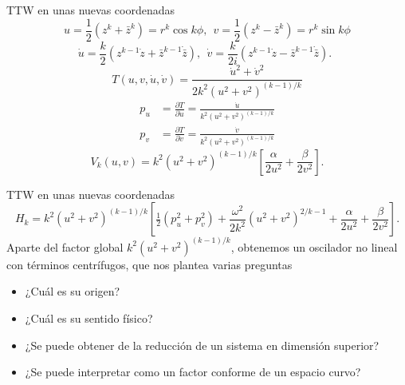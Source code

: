 \documentclass[aspectratio=169,mathserif]{beamer}
\begin{document}
  \begin{frame}{TTW en unas nuevas coordenadas}
    \begin{equation*}
	u=\frac{1}{2}(z^k+\bar{z}^k)=r^k\cos k\phi, \ \
	v=\frac{1}{2}(z^k-\bar{z}^k)=r^k\sin k\phi
    \end{equation*}
    \pause
    \begin{equation*}
      \dot{u}=\frac{k}{2}(z^{k-1}\dot{z}+\bar{z}^{k-1}\dot{\bar{z}}), \ \
      \dot{v}=\frac{k}{2i}(z^{k-1}\dot{z}-\bar{z}^{k-1}\dot{\bar{z}}). \ \
    \end{equation*}
    \pause
    \begin{equation*}
      T(u,v,\dot{u},\dot{v})=\frac{\dot{u}^2+\dot{v}^2}{2k^2(u^2+v^2)^{(k-1)/k}}
    \end{equation*}
    \pause
    \begin{align*}
      p_u&=\frac{\partial T}{\partial \dot{u}}=\frac{\dot{u}}{k^2(u^2+v^2)^{(k-1)/k}}\\
      p_v&=\frac{\partial T}{\partial \dot{v}}=\frac{\dot{v}}{k^2(u^2+v^2)^{(k-1)/k}}
    \end{align*}
    \pause
    \begin{equation*}
      V_k(u,v)=k^2(u^2+v^2)^{(k-1)/k}\left[ \frac{\alpha}{2u^2}+\frac{\beta}{2v^2} \right].
    \end{equation*}
  \end{frame}
  \begin{frame}{TTW en unas nuevas coordenadas}
    \begin{equation*}
      H_k=k^2(u^2+v^2)^{(k-1)/k}\left[ \tfrac{1}{2}(p_u^2+p_v^2)+\frac{\omega^2}{2k^2}(u^2+v^2)^{2/k-1}+\frac{\alpha}{2u^2}+\frac{\beta}{2v^2} \right].
    \end{equation*}
    \pause
   Aparte del factor global $k^2(u^2+v^2)^{(k-1)/k}$, obtenemos un oscilador no lineal con términos centrífugos, que nos plantea varias preguntas
    \pause
   \begin{itemize}
     \item ¿Cuál es su origen?
    \pause
     \item ¿Cuál es su sentido físico?
    \pause
     \item ¿Se puede obtener de la reducción de un sistema en dimensión superior?
    \pause
     \item ¿Se puede interpretar como un factor conforme de un espacio curvo?
   \end{itemize}
    
  \end{frame}
  
\end{document}
